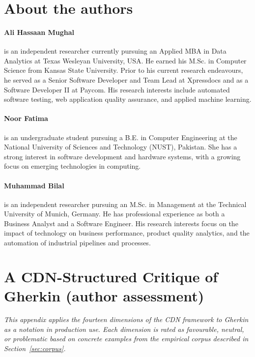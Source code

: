 \documentclass[11pt,a4paper]{article}
\begin{document}
\section*{About the authors}

\paragraph{Ali Hassaan Mughal} is an independent researcher currently
pursuing an Applied MBA in Data Analytics at Texas Wesleyan
University, USA. He earned his M.Sc. in Computer Science from Kansas
State University. Prior to his current research endeavours, he
served as a Senior Software Developer and Team Lead at Xpressdocs
and as a Software Developer II at Paycom. His research interests
include automated software testing, web application quality
assurance, and applied machine learning.

\paragraph{Noor Fatima} is an undergraduate student pursuing a
B.E. in Computer Engineering at the National University of Sciences
and Technology (NUST), Pakistan. She has a strong interest in
software development and hardware systems, with a growing focus on
emerging technologies in computing.

\paragraph{Muhammad Bilal} is an independent researcher pursuing an
M.Sc. in Management at the Technical University of Munich, Germany.
He has professional experience as both a Business Analyst and a
Software Engineer. His research interests focus on the impact of
technology on business performance, product quality analytics, and
the automation of industrial pipelines and processes.


\appendix

\section{A CDN-Structured Critique of Gherkin (author assessment)}
\label{app:cdn}
\label{sec:cdn}

\emph{This appendix applies the fourteen dimensions of the CDN
framework \citep{green1989cdn,green1996petre,blackwell2003cdn} to
Gherkin as a notation in production use. Each dimension is rated
as favourable, neutral, or problematic based on concrete examples
from the empirical corpus described in
Section~\ref{sec:corpus}.}
\end{document}
